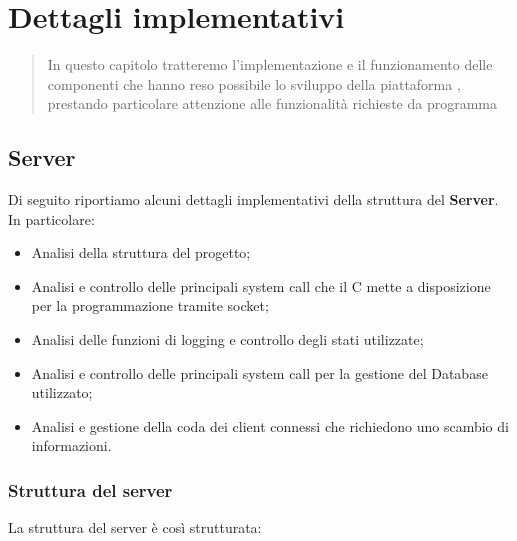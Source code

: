 \chapter{Dettagli implementativi}
  \begin{abstract}
    In questo capitolo tratteremo l'implementazione e il funzionamento delle componenti che hanno reso possibile lo sviluppo della piattaforma , prestando particolare attenzione alle funzionalità richieste da programma
  \end{abstract}
  \section{Server}
    Di seguito riportiamo alcuni dettagli implementativi della struttura del \textbf{Server}. In particolare:

    \begin{itemize}
      \item Analisi della struttura del progetto;
      \item Analisi e controllo delle principali system call che il C mette a disposizione per la programmazione tramite socket\footnotemark; 
      \item Analisi delle funzioni di logging e controllo degli stati utilizzate;
      \item Analisi e controllo delle principali system call per la gestione del Database utilizzato;
      \item Analisi e gestione della coda dei client connessi che richiedono uno scambio di informazioni.
    \end{itemize}

    \subsection{Struttura del server}
    La struttura del server è così strutturata:

